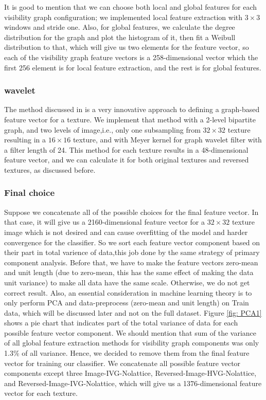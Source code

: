 \documentclass[conference]{IEEEtran}
\begin{document}
It is good to mention that we can choose both local and global features for each visibility graph configuration; we implemented local feature extraction with $3\times3$ windows and stride one. Also, for global features, we calculate the degree distribution for the graph and plot the histogram of it, then fit a Weibull distribution to that, which will give us two elements for the feature vector, so each of the visibility graph feature vectors is a 258-dimensional vector which the first 256 element is for local feature extraction, and the rest is for global features.

\subsubsection{\textbf{wavelet}}
The method discussed in \cite{b2} is a very innovative approach to defining a graph-based feature vector for a texture. We implement that method with a 2-level bipartite graph, and two levels of image,i.e., only one subsampling from $32\times32$ texture resulting in a $16\times16$ texture, and with Meyer kernel for graph wavelet filter with a filter length of 24.
This method for each texture results in a 48-dimensional feature vector, and we can calculate it for both original textures and reversed textures, as discussed before. 


\subsubsection*{\textbf{Final choice}}
Suppose we concatenate all of the possible choices for the final feature vector. In that case, it will give us a 2160-dimensional feature vector for a $32\times32$ texture image which is not desired and can cause overfitting of the model and harder convergence for the classifier. So we sort each feature vector component based on their part in total varience of data,this job done by the same strategy of primary component analysis. Before that, we have to make the feature vectors zero-mean and unit length (due to zero-mean, this has the same effect of making the data unit variance) to make all data have the same scale. Otherwise, we do not get correct result. Also, an essential consideration in machine learning theory is to only perform PCA and data-preprocess (zero-mean and unit length) on Train data, which will be discussed later and not on the full dataset.
Figure \ref{fig: PCA1} shows a pie chart that indicates part of the total variance of data for each possible feature vector component. We should mention that sum of the variance of all global feature extraction methods for visibility graph components was only 1.3\% of all variance. Hence, we decided to remove them from the final feature vector for training our classifier. We concatenate all possible feature vector components except three\: Image-IVG-Nolattice, Reversed-Image-HVG-Nolattice, and Reversed-Image-IVG-Nolattice, which will give us a 1376-dimensional feature vector for each texture.
\end{document}
